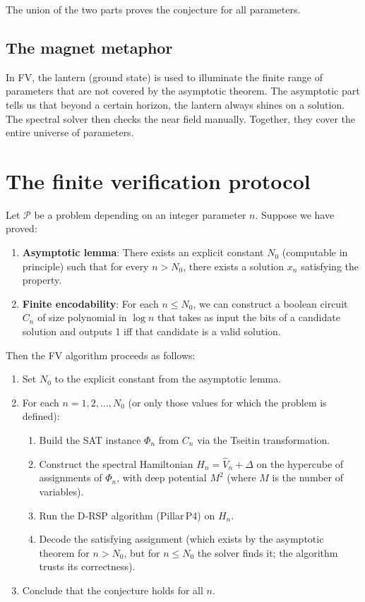 \documentclass[11pt,a4paper]{article}
\begin{document}
The union of the two parts proves the conjecture for all parameters.

\subsection{The magnet metaphor}

In FV, the lantern (ground state) is used to illuminate the finite range of parameters that are not covered by the asymptotic theorem. The asymptotic part tells us that beyond a certain horizon, the lantern always shines on a solution. The spectral solver then checks the near field manually. Together, they cover the entire universe of parameters.

\section{The finite verification protocol}

Let \(\mathcal{P}\) be a problem depending on an integer parameter \(n\). Suppose we have proved:

\begin{enumerate}
\item \textbf{Asymptotic lemma}: There exists an explicit constant \(N_0\) (computable in principle) such that for every \(n > N_0\), there exists a solution \(x_n\) satisfying the property.
\item \textbf{Finite encodability}: For each \(n \le N_0\), we can construct a boolean circuit \(C_n\) of size polynomial in \(\log n\) that takes as input the bits of a candidate solution and outputs 1 iff that candidate is a valid solution.
\end{enumerate}

Then the FV algorithm proceeds as follows:

\begin{enumerate}
\item Set \(N_0\) to the explicit constant from the asymptotic lemma.
\item For each \(n = 1,2,\dots,N_0\) (or only those values for which the problem is defined):
   \begin{enumerate}
   \item Build the SAT instance \(\Phi_n\) from \(C_n\) via the Tseitin transformation.
   \item Construct the spectral Hamiltonian \(H_n = \hat{V}_n + \Delta\) on the hypercube of assignments of \(\Phi_n\), with deep potential \(M^2\) (where \(M\) is the number of variables).
   \item Run the D‑RSP algorithm (Pillar P4) on \(H_n\).
   \item Decode the satisfying assignment (which exists by the asymptotic theorem for \(n > N_0\), but for \(n \le N_0\) the solver finds it; the algorithm trusts its correctness).
   \end{enumerate}
\item Conclude that the conjecture holds for all \(n\).
\end{enumerate}
\end{document}
